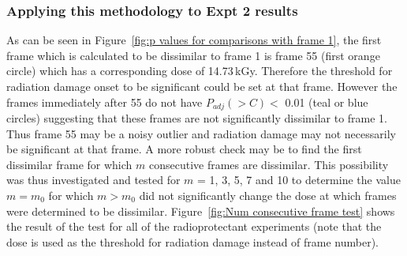 \subsubsection{Applying this methodology to Expt 2 results}
\label{subs:Applying this methodology to Expt 2 results}
As can be seen in Figure~\ref{fig:p values for comparisons with frame 1}, the first frame which is calculated to be dissimilar to frame 1 is frame 55 (first orange circle) which has a corresponding dose of 14.73$\,$kGy.
Therefore the threshold for radiation damage onset to be significant could be set at that frame.
However the frames immediately after 55 do not have $P_{adj}(>C) <$ 0.01 (teal or blue circles) suggesting that these frames are not significantly dissimilar to frame 1.
Thus frame 55 may be a noisy outlier and radiation damage may not necessarily be significant at that frame.
A more robust check may be to find the first dissimilar frame for which $m$ consecutive frames are dissimilar.
This possibility was thus investigated and tested for $m$ = 1, 3, 5, 7 and 10 to determine the value $m = m_0$ for which $m > m_0$ did not significantly change the dose at which frames were determined to be dissimilar.
Figure~\ref{fig:Num consecutive frame test} shows the result of the test for all of the radioprotectant experiments (note that the dose is used as the threshold for radiation damage instead of frame number).
